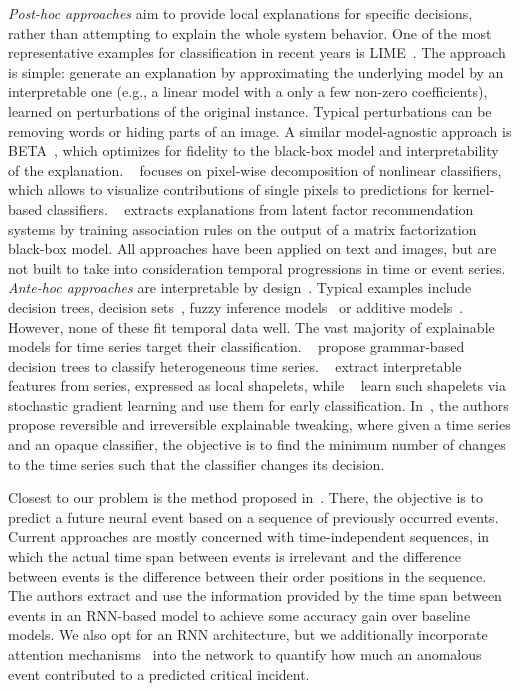 \documentclass[letterpaper]{article} %
\begin{document}
\textit{Post-hoc approaches} aim to provide local explanations for specific decisions, rather than attempting to explain the whole system behavior. One of the most representative examples for classification in recent years is LIME~\cite{lime}. The approach is simple: generate an explanation by approximating the underlying model by an interpretable one (e.g., a linear model with a only a few non-zero coefficients), learned on perturbations of the original instance. Typical perturbations can be removing words or hiding parts of an image. A similar model-agnostic approach is BETA~\cite{approximations}, which optimizes for fidelity to the black-box model and interpretability of the explanation. ~\cite{layerwise} focuses on pixel-wise decomposition of nonlinear classifiers, which allows to visualize contributions of single pixels to predictions for kernel-based classifiers. ~\cite{mining} extracts explanations from latent factor recommendation systems by training association rules on the output of a matrix factorization black-box model. All approaches have been applied on text and images, but are not built to take into consideration temporal progressions in time or event series.  \textit{Ante-hoc approaches} are interpretable by design~\cite{nphard}. Typical examples include decision trees, decision sets~\cite{decisionsets,anchors}, fuzzy inference models~\cite{pairwise} or additive models~\cite{additive}. However, none of these fit temporal data well.  The vast majority of explainable models for time series target their classification. ~\cite{categorization} propose grammar-based decision trees to classify heterogeneous time series.
~\cite{earlyclass,shapelets} extract interpretable features from series, expressed as local shapelets, while ~\cite{dtw} learn such shapelets via stochastic gradient learning and use them for early classification. In~\cite{irreversible}, the authors propose reversible and irreversible explainable tweaking, where given a time series and an opaque classifier, the objective is to find the minimum number of changes to the time series such that the classifier changes its decision.

\vspace{-0.75mm}
\vspace{-1.43mm}
\vspace{-2.85mm}
Closest to our problem is the method proposed in~\cite{iclr2018}. There, the objective is to predict a future neural event based on a sequence of previously occurred events. Current approaches are mostly concerned with time-independent sequences, in which the actual time span between events is irrelevant and the difference between events is the difference between their order positions in the sequence. The authors extract and use the information provided by the time span between events in an RNN-based model to achieve some accuracy gain over baseline models. We also opt for an RNN architecture, but we additionally incorporate attention mechanisms~\cite{attention} into the network to quantify how much an anomalous event contributed to a predicted critical incident.
\end{document}
